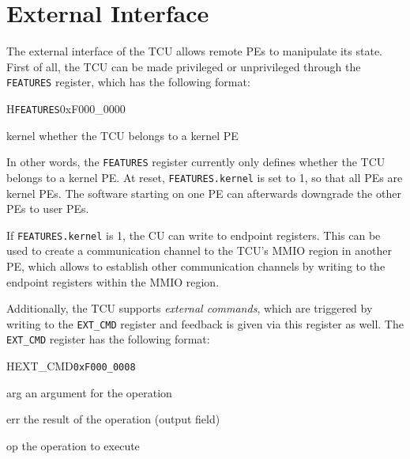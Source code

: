 \chapter{External Interface}

The external interface of the TCU allows remote PEs to manipulate its state. First of all, the TCU
can be made privileged or unprivileged through the \texttt{FEATURES} register, which has the
following format:

\setlength{\regWidth}{.95\textwidth}
\begin{register}{H}{\texttt{FEATURES}}{0xF000\_0000}
  \regnewline%
  \begin{regdesc}\begin{reglist}
    \item[kernel] whether the TCU belongs to a kernel PE
  \end{reglist}\end{regdesc}
\end{register}
\setlength{\regWidth}{\textwidth}

\noindent In other words, the \texttt{FEATURES} register currently only defines whether the TCU
belongs to a kernel PE. At reset, \texttt{FEATURES.kernel} is set to 1, so that all PEs are kernel
PEs. The software starting on one PE can afterwards downgrade the other PEs to user PEs.

If \texttt{FEATURES.kernel} is 1, the CU can write to endpoint registers. This can be used to create
a communication channel to the TCU's MMIO region in another PE, which allows to establish other
communication channels by writing to the endpoint registers within the MMIO region.

Additionally, the TCU supports \emph{external commands}, which are triggered by writing to the
\texttt{EXT\_CMD} register and feedback is given via this register as well. The \texttt{EXT\_CMD}
register has the following format:

\begin{register}{H}{EXT\_CMD}{\texttt{0xF000\_0008}}
  \regnewline%
  \begin{regdesc}\begin{reglist}
    \item[arg] an argument for the operation
    \item[err] the result of the operation (output field)
    \item[op] the operation to execute
  \end{reglist}\end{regdesc}
\end{register}

